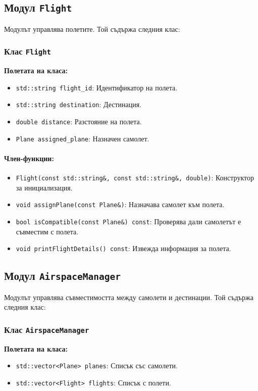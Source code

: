 \documentclass[a4paper,12pt]{article}
\begin{document}
\subsection{Модул \texttt{Flight}}
Модулът управлява полетите. Той съдържа следния клас:

\subsubsection*{Клас \texttt{Flight}}
\textbf{Полетата на класа:}
\begin{itemize}
    \item \texttt{std::string flight\_id}: Идентификатор на полета.
    \item \texttt{std::string destination}: Дестинация.
    \item \texttt{double distance}: Разстояние на полета.
    \item \texttt{Plane assigned\_plane}: Назначен самолет.
\end{itemize}

\paragraph*{Член-функции:}
\begin{itemize}
    \item \texttt{Flight(const std::string\&, const std::string\&, double)}: Конструктор за инициализация.
    \item \texttt{void assignPlane(const Plane\&)}: Назначава самолет към полета.
    \item \texttt{bool isCompatible(const Plane\&) const}: Проверява дали самолетът е съвместим с полета.
    \item \texttt{void printFlightDetails() const}: Извежда информация за полета.
\end{itemize}

\subsection{Модул \texttt{AirspaceManager}}
Модулът управлява съвместимостта между самолети и дестинации. Той съдържа следния клас:

\subsubsection*{Клас \texttt{AirspaceManager}}
\textbf{Полетата на класа:}
\begin{itemize}
    \item \texttt{std::vector<Plane> planes}: Списък със самолети.
    \item \texttt{std::vector<Flight> flights}: Списък с полети.
\end{itemize}
\end{document}
